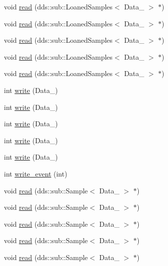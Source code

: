 \begin{DoxyCompactItemize}
\item 
void \hyperlink{classProcessingBlock_ad4d5346c19d8923d2d008293ccab7b02}{read} (dds\+::sub\+::\+Loaned\+Samples$<$ Data\+\_ $>$ $\ast$)
\item 
void \hyperlink{classProcessingBlock_adfd54db201d333b23ea78c466bdf5bb4}{read} (dds\+::sub\+::\+Loaned\+Samples$<$ Data\+\_ $>$ $\ast$)
\item 
void \hyperlink{classProcessingBlock_ae452768d47cbd57657af91d28804c539}{read} (dds\+::sub\+::\+Loaned\+Samples$<$ Data\+\_ $>$ $\ast$)
\item 
void \hyperlink{classProcessingBlock_a0f32c4dbc907eb7304b3a9fa08e34225}{read} (dds\+::sub\+::\+Loaned\+Samples$<$ Data\+\_ $>$ $\ast$)
\item 
void \hyperlink{classProcessingBlock_a44473ec23c6a212bd8ada8bb5d777a08}{read} (dds\+::sub\+::\+Loaned\+Samples$<$ Data\+\_ $>$ $\ast$)
\item 
int \hyperlink{classProcessingBlock_a8d0f41fb6371a35583d36988e3c775a1}{write} (Data\+\_)
\item 
int \hyperlink{classProcessingBlock_a12525c442526e3a65179327eefbc285c}{write} (Data\+\_)
\item 
int \hyperlink{classProcessingBlock_aa5e4574a9c073a7168de88c052f634af}{write} (Data\+\_)
\item 
int \hyperlink{classProcessingBlock_a641e4f0b9cce71f1b8dd0a5fab6d34bb}{write} (Data\+\_)
\item 
int \hyperlink{classProcessingBlock_a7b459f5c8f5bb87f035410cdf6c81dc6}{write} (Data\+\_)
\item 
int \hyperlink{classProcessingBlock_acdbdda9a147f47eb293e258b0d04c2fc}{write\+\_\+event} (int)
\item 
void \hyperlink{classProcessingBlock_a7ee3d280a6719691487258e4146965cf}{read} (dds\+::sub\+::\+Sample$<$ Data\+\_ $>$ $\ast$)
\item 
void \hyperlink{classProcessingBlock_a3892cdbc633672421f8e6520552a05a0}{read} (dds\+::sub\+::\+Sample$<$ Data\+\_ $>$ $\ast$)
\item 
void \hyperlink{classProcessingBlock_af5ed150919e8aefb2b59246a4446d85b}{read} (dds\+::sub\+::\+Sample$<$ Data\+\_ $>$ $\ast$)
\item 
void \hyperlink{classProcessingBlock_a88e1ff18f93e6b1ee81dceede85bc9f2}{read} (dds\+::sub\+::\+Sample$<$ Data\+\_ $>$ $\ast$)
\item 
void \hyperlink{classProcessingBlock_aeb371bfb05e3a32e7d0b979f946b028e}{read} (dds\+::sub\+::\+Sample$<$ Data\+\_ $>$ $\ast$)

\end{DoxyCompactItemize}
